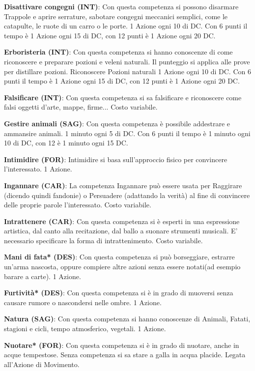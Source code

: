 \begin{multicols}{2}
\textbf{Disattivare congegni (INT)}: Con questa competenza si possono disarmare Trappole e aprire serrature, sabotare congegni meccanici semplici, come le catapulte, le ruote di un carro o le porte. 1 Azione ogni 10 di DC. Con 6 punti il tempo è 1 Azione ogni 15 di DC, con 12 punti è 1 Azione ogni 20 DC.

\textbf{Erboristeria (INT)}: Con questa competenza si hanno conoscenze di come riconoscere e preparare pozioni e veleni naturali. Il punteggio si applica alle prove per distillare pozioni. Riconoscere Pozioni naturali 1 Azione ogni 10 di DC. Con 6 punti il tempo è 1 Azione ogni 15 di DC, con 12 punti è 1 Azione ogni 20 DC.

\textbf{Falsificare (INT)}: Con questa competenza si sa falsificare e riconoscere come falsi oggetti d'arte, mappe, firme... Costo variabile.

\textbf{Gestire animali (SAG)}: Con questa competenza è possibile addestrare e ammansire animali. 1 minuto ogni 5 di DC. Con 6 punti il tempo è 1 minuto ogni 10 di DC, con 12 è 1 minuto ogni 15 DC.

\textbf{Intimidire (FOR)}: Intimidire si basa sull'approccio fisico per convincere l'interessato. 1 Azione.

\textbf{Ingannare (CAR)}: La competenza Ingannare può essere usata per Raggirare (dicendo quindi fandonie) o Persuadere (adattando la verità) al fine di convincere delle proprie parole l'interessato. Costo variabile.

\textbf{Intrattenere (CAR)}: Con questa competenza si è esperti in una espressione artistica, dal canto alla recitazione, dal ballo a suonare strumenti musicali. E' necessario specificare la forma di intrattenimento. Costo variabile.

\textbf{Mani di fata* (DES)}: Con questa competenza si può borseggiare, estrarre un'arma nascosta, oppure compiere altre azioni senza essere notati(ad esempio barare a carte). 1 Azione.

\textbf{Furtività* (DES)}: Con questa competenza si è in grado di muoversi senza causare rumore o nascondersi nelle ombre. 1 Azione.

\textbf{Natura (SAG)}: Con questa competenza si hanno conoscenze di Animali, Fatati, stagioni e cicli, tempo atmosferico, vegetali. 1 Azione.

\textbf{Nuotare* (FOR)}: Con questa competenza si è in grado di nuotare, anche in acque tempestose. Senza competenza si sa stare a galla in acqua placide. Legata all'Azione di Movimento.


\end{multicols}
